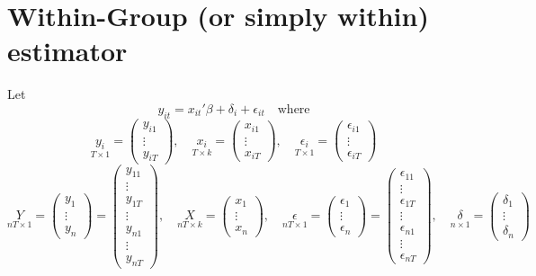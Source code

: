 \documentclass[DIV=14,titlepage=false]{scrreprt}
\begin{document}
\section{Within-Group (or simply within) estimator}
Let 
\[
    y_{it}=x_{it}'\beta+\delta_i+\epsilon_{it} \quad \text{where}
\]
\[
    \underset{T\times1}{y_i} = \begin{pmatrix} y_{i1} \\ \vdots \\ y_{iT} \end{pmatrix}, \quad \underset{T\times k}{x_i} = \begin{pmatrix} x_{i1} \\ \vdots \\ x_{iT} \end{pmatrix}, \quad \underset{T\times1}{\epsilon_i} = \begin{pmatrix} \epsilon_{i1} \\ \vdots \\ \epsilon_{iT} \end{pmatrix}
\]
\[
   \underset{nT \times 1}{Y} = \begin{pmatrix} y_{1} \\ \vdots \\ y_{n} \end{pmatrix} =\begin{pmatrix} y_{11} \\ \vdots \\ y_{1T} \\ \vdots \\ y_{n1} \\ \vdots \\ y_{nT} \end{pmatrix}, \quad \underset{nT \times k}{X} = \begin{pmatrix} x_{1} \\ \vdots \\ x_{n} \end{pmatrix}, \quad \underset{nT \times 1}{\epsilon} = \begin{pmatrix} \epsilon_{1} \\ \vdots \\ \epsilon_{n} \end{pmatrix} =\begin{pmatrix} \epsilon_{11} \\ \vdots \\ \epsilon_{1T} \\ \vdots \\ \epsilon_{n1} \\ \vdots \\ \epsilon_{nT} \end{pmatrix}, \quad \underset{n\times1}{\delta} = \begin{pmatrix} \delta_{1} \\ \vdots \\ \delta_{n} \end{pmatrix}
\]
\end{document}
